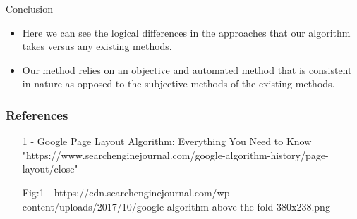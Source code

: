 \documentclass[11pt]{beamer}
\begin{document}
	\begin{frame}{Conclusion}
		\begin{itemize}
			\item Here we can see the logical differences in the approaches that our algorithm takes versus any existing methods.
			\item Our method relies on an objective and automated method that is consistent in nature as opposed to the subjective methods of the existing methods.
		\end{itemize}
	\end{frame}
	\begin{frame}
		\frametitle{\LARGE \textbf{References}}
		\begin{itemize}
			\item [1] - Google Page Layout Algorithm: Everything You Need to Know 
			"https://www.searchenginejournal.com/google-algorithm-history/page-layout/close"
			\item [Fig:1] - https://cdn.searchenginejournal.com/wp-content/uploads/2017/10/google-algorithm-above-the-fold-380x238.png
		\end{itemize}
	\end{frame}
\end{document}
